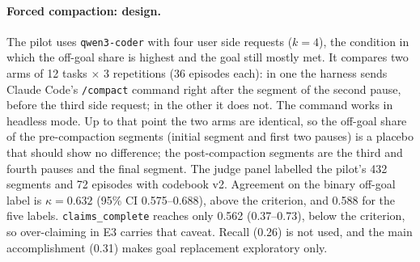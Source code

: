\paragraph{Forced compaction: design.} The pilot uses \texttt{qwen3-coder} with four user side
requests ($k=4$), the condition in which the off-goal share is highest and the goal still mostly
met. It compares two arms of 12 tasks $\times$ 3 repetitions (36 episodes each): in one the harness
sends Claude Code's \texttt{/compact} command right after the segment of the second pause, before
the third side request; in the other it does not. The command works in headless mode. Up to that point the two
arms are identical, so the off-goal share of the pre-compaction segments (initial segment and first
two pauses) is a placebo that should show no difference; the post-compaction segments are the third
and fourth pauses and the final segment. The judge panel labelled the pilot's 432 segments and 72
episodes with codebook v2. Agreement on the binary off-goal label is $\kappa=0.632$ (95\% CI
0.575--0.688), above the criterion, and 0.588 for the five labels. \texttt{claims\_complete} reaches
only 0.562 (0.37--0.73), below the criterion, so over-claiming in E3 carries that caveat. Recall
(0.26) is not used, and the main accomplishment (0.31) makes goal replacement exploratory only.

\begin{table}[t]
  \centering
  \caption{E3, forced-compaction pilot: \texttt{qwen3-coder}, four user side requests, 12 tasks
  $\times$ 3 repetitions per arm, \texttt{/compact} sent after the second pause. Difference:
  compaction minus no compaction, with 95\% task-cluster bootstrap interval. Off-goal share:
  segments labelled \textsf{SANCTIONED}, \textsf{NECESSARY} or \textsf{DISTRACTOR}; with this source
  it consists mostly of work on the user's own requests. Pre-compaction segments are a placebo.
  Over-claim rests on \texttt{claims\_complete}, whose agreement on E3 is below the criterion
  ($\kappa=0.56$); goal replacement is exploratory ($\kappa=0.31$). The pilot is exploratory.}
  \label{tab:e3pilot}
  \small
  \fittable{}
\end{table}

